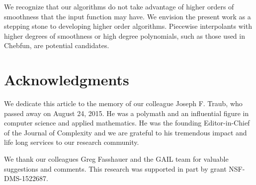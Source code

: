 \documentclass[review]{elsarticle}
\theoremstyle{definition}
\begin{document}
We recognize that our algorithms do not take advantage of higher orders of
smoothness that the input function may have. We envision the present work as a
stepping stone to developing higher order algorithms. Piecewise interpolants
with higher degrees of smoothness or high degree polynomials, such as those used
in Chebfun, are potential candidates.


\section*{Acknowledgments}

We dedicate this article to the memory of our colleague Joseph F. Traub, who
passed away on August 24, 2015. He was a polymath and an influential figure in
computer science and applied mathematics. He was the founding Editor-in-Chief of
the Journal of Complexity and we are grateful to his tremendous impact and life
long services to our research community.

We thank our colleagues Greg Fasshauer and the GAIL team for
valuable suggestions and comments. This research was supported in part by grant
NSF-DMS-1522687.





\end{document}
